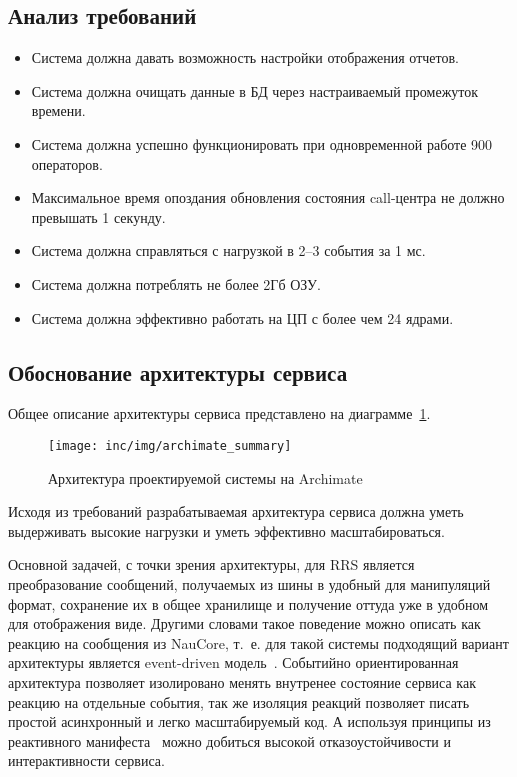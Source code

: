 \subsection{Анализ требований}

\begin{itemize}
    \item Система должна давать возможность настройки отображения отчетов.
    \item Система должна очищать данные в БД через настраиваемый промежуток времени.
    \item Система должна успешно функционировать при одновременной работе 900 операторов.
    \item Максимальное время опоздания обновления состояния call-центра не должно превышать 1 секунду.
    \item Система должна справляться с нагрузкой в 2--3 события за 1 мс.
    \item Система должна потреблять не более 2Гб ОЗУ.
    \item Система должна эффективно работать на ЦП с более чем 24 ядрами.
\end{itemize}

\subsection{Обоснование архитектуры сервиса}

Общее описание архитектуры сервиса представлено на диаграмме~\ref{pic:archimate:summary}.

\begin{figure}[!ht]
    \centering
    \texttt{[image: inc/img/archimate\_summary]}
    \caption{Архитектура проектируемой системы на Archimate}
    \label{pic:archimate:summary}
\end{figure}

Исходя из требований разрабатываемая архитектура
сервиса должна уметь выдерживать высокие нагрузки и уметь эффективно масштабироваться.

Основной задачей, с точки зрения архитектуры,
для RRS является преобразование сообщений, получаемых из шины в удобный для манипуляций формат,
сохранение их в общее хранилище и получение оттуда уже в удобном для отображения виде.
Другими словами такое поведение можно описать как реакцию на сообщения из NauCore,
т.~е. для такой системы подходящий вариант архитектуры является event-driven модель~\cite{software-architecture-patterns}.
Событийно ориентированная архитектура позволяет изолировано менять внутренее состояние сервиса как реакцию на
отдельные события, так же изоляция реакций позволяет писать простой асинхронный и легко масштабируемый код.
А используя принципы из реактивного манифеста~\cite{reactive-manifesto} можно добиться высокой отказоустойчивости и интерактивности сервиса.

